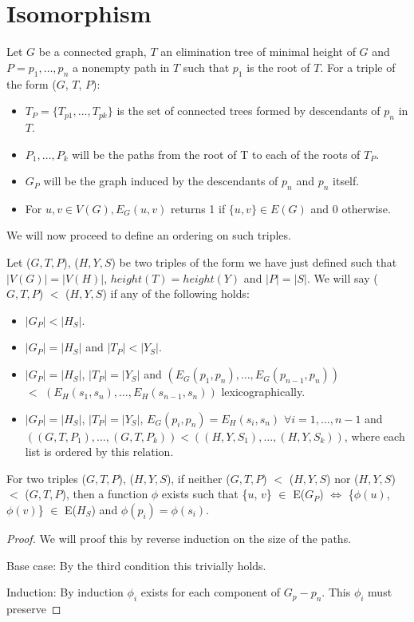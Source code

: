 \section{Isomorphism}
\begin{definition}
Let $G$ be a connected graph, $T$ an elimination tree of minimal height of $G$ and $P = p_1,\ldots, p_n$ a nonempty path in $T$ such that $p_1$ is the root of $T$. For a triple of the form ($G$, $T$, $P$):
 
\begin{itemize}
 \item $T_P = \{T_{p1}, \ldots, T_{pk}\}$ is the set of connected trees formed by descendants of $p_n$ in $T$.
 \item $P_1, \ldots, P_k$ will be the paths from the root of T to each of the roots of $T_P$.
 \item $G_P$ will be the graph induced by the descendants of $p_n$ and $p_n$ itself.
 \item For $u,v \in V(G), E_G(u, v)$ returns 1 if $\{u, v\} \in E(G)$ and 0 otherwise.
 \end{itemize}
We will now proceed to define an ordering on such triples.
\end{definition}
 
\begin{definition}
Let ($G, T, P$), ($H, Y, S$) be two triples of the form we have just defined such that $|V(G)| = |V(H)|$, $height(T) = height(Y)$ and $|P| = |S|$. We will say ($G, T, P$) $<$ ($H, Y, S$) if any of the following holds:
 
\begin{itemize}
\item $|G_P| < |H_S|$.
\item $|G_P| = |H_S|$ and $|T_P| < |Y_S|$.
\item $|G_P| = |H_S|$, $|T_P| = |Y_S|$ and $(E_G(p_1, p_n), \ldots, E_G(p_{n-1}, p_n))$ \\ $ < $ $(E_H(s_1, s_n), \ldots, E_H(s_{n-1}, s_n))$ lexicographically.
\item $|G_P| = |H_S|$, $|T_P| = |Y_S|$, $E_G(p_i, p_n) = E_H(s_i, s_n)$ $\forall i = 1, \ldots, n-1$ and $((G, T, P_1), \ldots, (G, T, P_k)) < ((H, Y, S_1), \ldots, (H, Y, S_k))$, where each list is ordered by this relation.
\end{itemize}
 
\begin{lemma}
For two triples ($G, T, P$), ($H, Y, S$), if neither ($G, T, P$) $<$ ($H, Y, S$) nor ($H, Y, S$) $<$ ($G, T, P$), then a function $\phi$ exists such that \{$u$, $v$\} $\in$ E($G_P$) $\iff$ \{$\phi(u)$, $\phi(v)$\} $\in$ E($H_S$) and $\phi(p_i) = \phi(s_i)$.
\end{lemma}
 
\begin{proof}
We will proof this by reverse induction on the size of the paths.

Base case: By the third condition this trivially holds.

Induction:
By induction $\phi_i$ exists for each component of $G_p - p_n$. This $\phi_i$ must preserve 
\end{proof}
 
\end{definition}